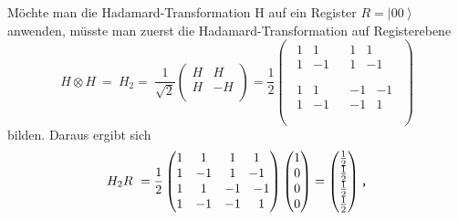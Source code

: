 Möchte man die Hadamard-Transformation H auf ein Register $R=\left|00\right\rangle$ anwenden, müsste man zuerst die Hadamard-Transformation auf Registerebene 
$$H\otimes H\ =\ H_2=\ \frac{1}{\sqrt2}\left(\begin{matrix}H&H\\H&-H\\\end{matrix}\right)=\frac{1}{2}\left(\begin{matrix}\begin{matrix}1&1\\1&-1\\\end{matrix}&\begin{matrix}1&1\\1&-1\\\end{matrix}\\\begin{matrix}1&1\\1&-1\\\end{matrix}&\begin{matrix}-1&-1\\-1&1\\\end{matrix}\\\end{matrix}\right)$$
bilden. Daraus ergibt sich
$$H_2R\ =\frac{1}{2}\left(\begin{matrix}\begin{matrix}1&1\\1&-1\\\end{matrix}&\begin{matrix}1&1\\1&-1\\\end{matrix}\\\begin{matrix}1&1\\1&-1\\\end{matrix}&\begin{matrix}-1&-1\\-1&1\\\end{matrix}\\\end{matrix}\right)\left(\begin{matrix}1\\\begin{matrix}0\\\begin{matrix}0\\0\\\end{matrix}\\\end{matrix}\\\end{matrix}\right)=\left(\begin{matrix}\frac{1}{2}\\\frac{1}{2}\\\frac{1}{2}\\\frac{1}{2}\\\end{matrix}\right)\verb|,|$$
